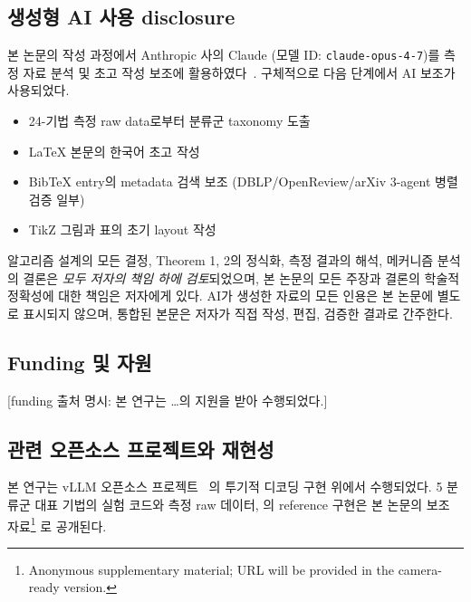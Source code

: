 \subsection*{생성형 AI 사용 disclosure}

본 논문의 작성 과정에서 Anthropic 사의 Claude (모델 ID: \texttt{claude-opus-4-7})를 측정 자료 분석 및 초고 작성 보조에 활용하였다~\cite{ieee-ai-policy-2024, acm-ai-policy-2024}.
구체적으로 다음 단계에서 AI 보조가 사용되었다.

\begin{itemize}
  \item 24-기법 측정 raw data로부터 분류군 taxonomy 도출
  \item LaTeX 본문의 한국어 초고 작성
  \item BibTeX entry의 metadata 검색 보조 (DBLP/OpenReview/arXiv 3-agent 병렬 검증 일부)
  \item TikZ 그림과 표의 초기 layout 작성
\end{itemize}

알고리즘 설계의 모든 결정, Theorem 1, 2의 정식화, 측정 결과의 해석, 메커니즘 분석의 결론은 \emph{모두 저자의 책임 하에 검토}되었으며, 본 논문의 모든 주장과 결론의 학술적 정확성에 대한 책임은 저자에게 있다.
AI가 생성한 자료의 모든 인용은 본 논문에 별도로 표시되지 않으며, 통합된 본문은 저자가 직접 작성, 편집, 검증한 결과로 간주한다.

\subsection*{Funding 및 자원}

[funding 출처 명시: 본 연구는 \dots 의 지원을 받아 수행되었다.]

\subsection*{관련 오픈소스 프로젝트와 재현성}

본 연구는 vLLM 오픈소스 프로젝트~\cite{kwon2023vllm} 의 투기적 디코딩 구현 위에서 수행되었다.
5 분류군 대표 기법의 실험 코드와 측정 raw 데이터, \algname 의 reference 구현은 본 논문의 보조 자료\footnote{Anonymous supplementary material; URL will be provided in the camera-ready version.} 로 공개된다.
